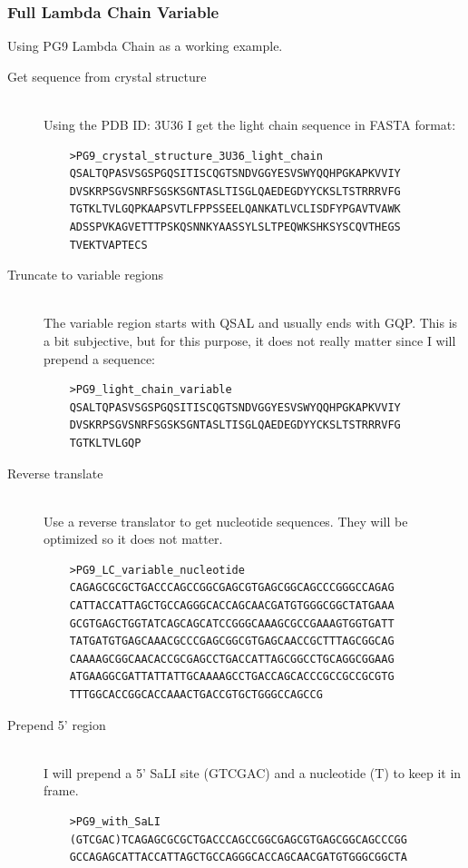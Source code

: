 \subsubsection{Full Lambda Chain Variable}
Using PG9 Lambda Chain as a working example.
\begin{description}
  \item[Get sequence from crystal structure] \hfill \\
  Using the PDB ID: 3U36 I get the light chain sequence in FASTA format:
    \begin{verbatim}
    >PG9_crystal_structure_3U36_light_chain
    QSALTQPASVSGSPGQSITISCQGTSNDVGGYESVSWYQQHPGKAPKVVIY
    DVSKRPSGVSNRFSGSKSGNTASLTISGLQAEDEGDYYCKSLTSTRRRVFG
    TGTKLTVLGQPKAAPSVTLFPPSSEELQANKATLVCLISDFYPGAVTVAWK
    ADSSPVKAGVETTTPSKQSNNKYAASSYLSLTPEQWKSHKSYSCQVTHEGS
    TVEKTVAPTECS
    \end{verbatim}
  \item[Truncate to variable regions] \hfill \\
  The variable region starts with QSAL and usually ends with GQP. This is a bit subjective, but for this purpose, it does not really matter since I will prepend a sequence:
    \begin{verbatim}
    >PG9_light_chain_variable
    QSALTQPASVSGSPGQSITISCQGTSNDVGGYESVSWYQQHPGKAPKVVIY
    DVSKRPSGVSNRFSGSKSGNTASLTISGLQAEDEGDYYCKSLTSTRRRVFG
    TGTKLTVLGQP
    \end{verbatim}
  \item[Reverse translate] \hfill \\
  Use a reverse translator to get nucleotide sequences. They will be optimized so it does not matter.
    \begin{verbatim}
    >PG9_LC_variable_nucleotide
    CAGAGCGCGCTGACCCAGCCGGCGAGCGTGAGCGGCAGCCCGGGCCAGAG
    CATTACCATTAGCTGCCAGGGCACCAGCAACGATGTGGGCGGCTATGAAA
    GCGTGAGCTGGTATCAGCAGCATCCGGGCAAAGCGCCGAAAGTGGTGATT
    TATGATGTGAGCAAACGCCCGAGCGGCGTGAGCAACCGCTTTAGCGGCAG
    CAAAAGCGGCAACACCGCGAGCCTGACCATTAGCGGCCTGCAGGCGGAAG
    ATGAAGGCGATTATTATTGCAAAAGCCTGACCAGCACCCGCCGCCGCGTG
    TTTGGCACCGGCACCAAACTGACCGTGCTGGGCCAGCCG
    \end{verbatim}
  \item[Prepend 5' region] \hfill \\
  I will prepend a 5' SaLI site (GTCGAC) and a nucleotide (T) to keep it in frame.
    \begin{verbatim}
    >PG9_with_SaLI
    (GTCGAC)TCAGAGCGCGCTGACCCAGCCGGCGAGCGTGAGCGGCAGCCCGG
    GCCAGAGCATTACCATTAGCTGCCAGGGCACCAGCAACGATGTGGGCGGCTA

\end{verbatim}
\end{description}

